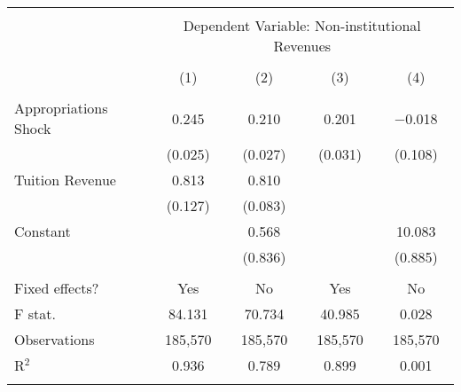 
\begin{tabular}{@{\extracolsep{5pt}}lcccc} 
\\[-1.8ex]\hline 
\hline \\[-1.8ex] 
 & \multicolumn{4}{c}{Dependent Variable: Non-institutional Revenues} \\ 
\cline{2-5} 
\\[-1.8ex] & (1) & (2) & (3) & (4)\\ 
\hline \\[-1.8ex] 
 Appropriations Shock & 0.245 & 0.210 & 0.201 & $-$0.018 \\ 
  & (0.025) & (0.027) & (0.031) & (0.108) \\ 
  Tuition Revenue & 0.813 & 0.810 &  &  \\ 
  & (0.127) & (0.083) &  &  \\ 
  Constant &  & 0.568 &  & 10.083 \\ 
  &  & (0.836) &  & (0.885) \\ 
 \hline \\[-1.8ex] 
Fixed effects? & Yes & No & Yes & No \\ 
F stat. & 84.131 & 70.734 & 40.985 & 0.028 \\ 
Observations & 185,570 & 185,570 & 185,570 & 185,570 \\ 
R$^{2}$ & 0.936 & 0.789 & 0.899 & 0.001 \\ 
\hline 
\hline \\[-1.8ex] 
\end{tabular} 

